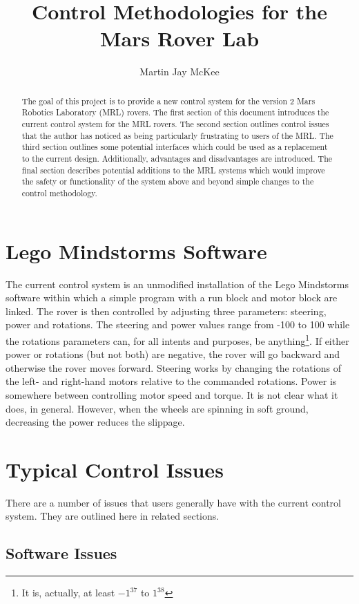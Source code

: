 \documentclass[letterpaper,10pt]{article}
\title{Control Methodologies for the Mars Rover Lab}
\author{Martin Jay McKee}
\date{}
\begin{document}
\maketitle

\begin{abstract}
  The goal of this project is to provide a new control system for the version 2 Mars Robotics Laboratory (MRL) rovers.  The first section of this document introduces the current control system for the MRL rovers.  The second section outlines control issues that the author has noticed as being particularly frustrating to users of the MRL.  The third section outlines some potential interfaces which could be used as a replacement to the current design.  Additionally, advantages and disadvantages are introduced.  The final section describes potential additions to the MRL systems which would improve the safety or functionality of the system above and beyond simple changes to the control methodology.
\end{abstract}

\section{Lego Mindstorms Software}
  The current control system is an unmodified installation of the Lego Mindstorms software within which a simple program with a run block and motor block are linked.  The rover is then controlled by adjusting three parameters: steering, power and rotations.  The steering and power values range from -100 to 100 while the rotations parameters can, for all intents and purposes, be anything\footnote{It is, actually, at least $-1^{37}$ to $1^{38}$}.  If either power or rotations (but not both) are negative, the rover will go backward and otherwise the rover moves forward.  Steering works by changing the rotations of the left- and right-hand motors relative to the commanded rotations.  Power is somewhere between controlling motor speed and torque.  It is not clear what it does, in general.  However, when the wheels are spinning in soft ground, decreasing the power reduces the slippage.
  
\section{Typical Control Issues}
  There are a number of issues that users generally have with the current control system.  They are outlined here in related sections.
  
  \subsection{Software Issues}
\end{document}
